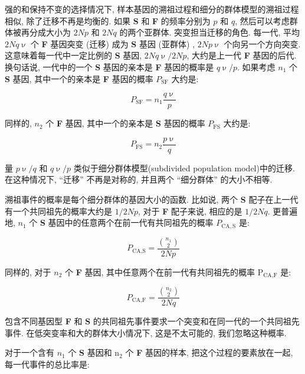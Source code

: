 \documentclass[
    12pt,%
    ]{article}
\begin{document}
强的和保持不变的选择情况下, 样本基因的溯祖过程和细分的群体模型的溯祖过程相似, 除了迁移不再是均衡的. 如果 \textbf{S} 和
\textbf{F} 的频率分别为 $p$ 和 $q$, 然后可以考虑群体被再分成大小为 $2Np$ 和 $2Nq$ 的两个亚群体. 突变担当迁移的角色.
每一代, 平均 $2Nq\upnu$ 个 \textbf{F} 基因突变 (迁移) 成为 \textbf{S} 基因 (亚群体) , $2Np\upnu$
个向另一个方向突变. 这意味着每一代中一定比例的 \textbf{S} 基因, $2Nq\upnu/2Np$, 大约是上一代 \textbf{F}
基因的后代. 换句话说, 一代中的一个 \textbf{S} 基因的亲本是 \textbf{F} 基因的概率是 $q\upnu/p$. 如果考虑 $n_{1}$
个 \textbf{S} 基因, 其中一个的亲本是 \textbf{F} 基因的概率 $P_{\text{SF}}$ 大约是:

\begin{equation*}
    P_{\text{SF}}=n_{1}\frac{q\upnu}{p}
\end{equation*}

同样的, $n_{2}$ 个 \textbf{F} 基因, 其中一个的亲本是 \textbf{S} 基因的概率 $P_{\text{FS}}$ 大约是: \newline

\begin{equation*}
    P_{\text{FS}}=n_{2}\frac{p\upnu}{q}
\end{equation*}

量 $p\upnu/q$ 和 $q\upnu/p$ 类似于细分群体模型(subdivided population model)中的迁移. 在这种情况下, ``迁移''
不再是对称的, 并且两个 ``细分群体'' 的大小不相等.

溯祖事件的概率是每个细分群体的基因大小的函数. 比如说, 两个 \textbf{S} 配子在上一代有一个共同祖先的概率大约是 $1/2Np$,
对于 \textbf{F} 配子来说, 相应的是 $1/2Nq$. 更普遍地, $n_{1}$ 个 \textbf{S}
基因中的任意两个在前一代有共同祖先的概率 $P_{\text{CA},\mathrm{S}}$ 是:

\begin{equation*}
    P_{\text{CA},\text{S}}=\frac{\binom{n_1}{2}}{2Np}
\end{equation*}

同样的, 对于 $n_{2}$ 个 \textbf{F} 基因, 其中任意两个在前一代有共同祖先的概率
$\text{P}_{\text{CA},\text{F}}$ 是:

\begin{equation*}
    P_{\text{CA},\text{F}}=\frac{\binom{n_2}{2}}{2Nq}
\end{equation*}

包含不同基因型 \textbf{F} 和 \textbf{S} 的共同祖先事件要求一个突变和在同一代的一个共同祖先事件.
在低突变率和大的群体大小情况下, 这是不太可能的, 我们忽略这种概率.

对于一个含有 $n_{1}$ 个 \textbf{S} 基因和 n$_{\text{2}}$ 个 \textbf{F} 基因的样本, 把这个过程的要素放在一起,
每一代事件的总比率是:
\end{document}
